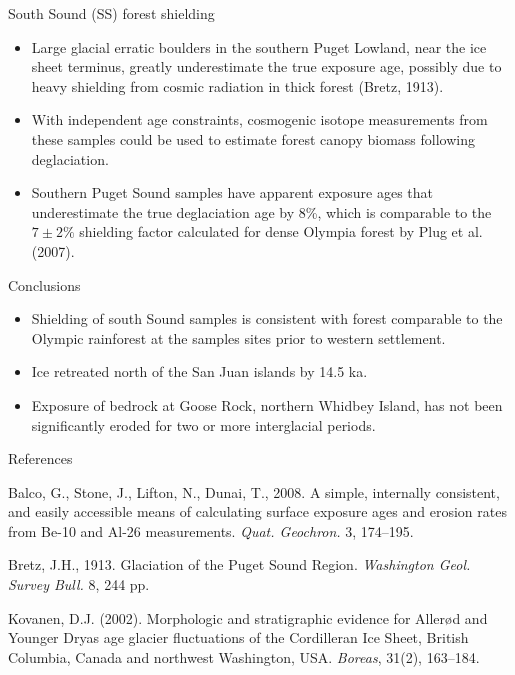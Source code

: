 \documentclass{beamer}
\begin{document}
\begin{frame}{}
\begin{columns}[T]
\begin{column}{.32\columnwidth}
\begin{block}{South Sound (SS) forest shielding}
\begin{itemize}
\item Large glacial erratic boulders in the southern Puget Lowland, near the ice sheet terminus, greatly underestimate the true exposure age, possibly due to heavy shielding from cosmic radiation in thick forest (Bretz, 1913).
\item With independent age constraints, cosmogenic isotope measurements from these samples could be used to estimate forest canopy biomass following deglaciation.
\item Southern Puget Sound samples have apparent exposure ages that underestimate the true deglaciation age by 8\%, which is comparable to the $7\pm2\%$ shielding factor calculated for dense Olympia forest by Plug et al. (2007).
\end{itemize}
\end{block}

\begin{block}{Conclusions}
\begin{itemize}
\item Shielding of south Sound samples is consistent with forest comparable to the Olympic rainforest at the samples sites prior to western settlement.
\item Ice retreated north of the San Juan islands by 14.5 ka.
\item Exposure of bedrock at Goose Rock, northern Whidbey Island, has not been significantly eroded for two or more interglacial periods.
\end{itemize}
\end{block}

\begin{block}{References} 
\begin{itemize}
{\tiny

\item Balco, G., Stone, J., Lifton, N., Dunai, T., 2008. A simple, internally consistent, and easily accessible means of calculating surface exposure ages and erosion rates from Be-10 and Al-26 measurements. \emph{Quat. Geochron.} 3, 174--195.

\item Bretz, J.H., 1913. Glaciation of the Puget Sound Region. \emph{Washington Geol. Survey Bull.} 8, 244 pp.

\item Kovanen, D.J. (2002). Morphologic and stratigraphic evidence for Allerød and Younger Dryas age glacier fluctuations of the Cordilleran Ice Sheet, British Columbia, Canada and northwest Washington, USA. \emph{Boreas}, 31(2), 163--184.

}
\end{itemize}
\end{block}
\end{column}
\end{columns}
\end{frame}
\end{document}
